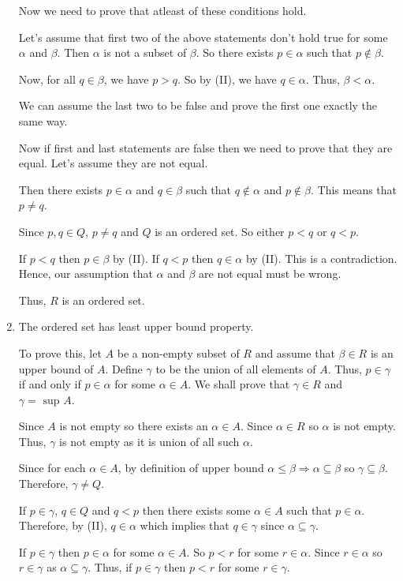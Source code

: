 \begin{enumerate}[{\bf Step 1.}]
Now we need to prove that atleast of these conditions hold.

Let's assume that first two of the above statements don't hold true for some $\alpha$ and $\beta$.
Then $\alpha$ is not a subset of $\beta$.
So there exists $p \in \alpha$ such that $p \notin \beta$.

Now, for all $q \in \beta$, we have $p > q$. 
So by (II), we have $q \in \alpha$. Thus, $\beta < \alpha$.

We can assume the last two to be false and prove the first one exactly the same way.

Now if first and last statements are false then we need to prove that they are equal.
Let's assume they are not equal.

Then there exists $p \in \alpha$ and $q \in \beta$ such that $q \notin \alpha$ and $p \notin \beta$.
This means that $p \neq q$.

Since $p, q \in Q$, $p \neq q$ and $Q$ is an ordered set. 
So either $p < q$ or $q < p$.

If $p < q$ then $p \in \beta$ by (II). If $q < p$ then $q \in \alpha$ by (II).
This is a contradiction. Hence, our assumption that $\alpha$ and $\beta$ are not equal must be wrong.

Thus, $R$ is an ordered set.

\item The ordered set has least upper bound property. 

To prove this, let $A$ be a non-empty subset of $R$ and assume that $\beta \in R$ is an upper bound of $A$.
Define $\gamma$ to be the union of all elements of $A$.
Thus, $p \in \gamma$ if and only if $p \in \alpha$ for some $\alpha \in A$.
We shall prove that $\gamma \in R$ and $\gamma = \text{ sup } A$.

Since $A$ is not empty so there exists an $\alpha \in A$.
Since $\alpha \in R$ so $\alpha$ is not empty. 
Thus, $\gamma$ is not empty as it is union of all such $\alpha$.

Since for each $\alpha \in A$, by definition of upper bound $\alpha \leq \beta \Rightarrow \alpha \subseteq \beta$ so $\gamma \subseteq \beta$. 
Therefore, $\gamma \neq Q$.

If $p \in \gamma$, $q \in Q$ and $q < p$ then there exists some $\alpha \in A$ such that $p \in \alpha$.
Therefore, by (II), $q \in \alpha$ which implies that $q \in \gamma$ since $\alpha \subseteq \gamma$.

If $p \in \gamma$ then $p \in \alpha$ for some $\alpha \in A$. So $p < r$ for some $r \in \alpha$.
Since $r \in \alpha$ so $r \in \gamma$ as $\alpha \subseteq \gamma$.
Thus, if $p \in \gamma$ then $p < r$ for some $r \in \gamma$.


\end{enumerate}
